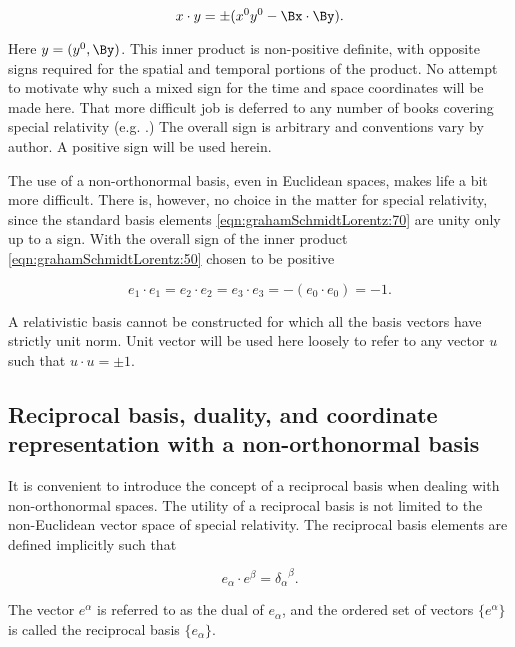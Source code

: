 \begin{equation}\label{eqn:grahamSchmidtLorentz:50}
x \cdot y = \pm( x^0 y^0 - \Bx \cdot \By ).
\end{equation}

Here $y = (y^0, \By)$.  This inner product is non-positive definite, with opposite signs required for the spatial and temporal portions of the product.
No attempt to motivate why such a mixed sign for the time and space coordinates will be made here.  That more difficult job is deferred to any number of books covering special relativity
(e.g. \citep{landau1980classical}.)
The overall sign is arbitrary and conventions vary by author.  A positive sign will be used herein.

The use of a non-orthonormal basis, even in Euclidean spaces, makes life a bit more difficult.  There is, however, no choice in the matter for special relativity, since the standard basis elements \ref{eqn:grahamSchmidtLorentz:70} are unity only up to a sign.  With the overall sign of the inner product \ref{eqn:grahamSchmidtLorentz:50} chosen to be positive

\begin{equation}\label{eqn:grahamSchmidtLorentz:860}
e_1 \cdot e_1 = e_2 \cdot e_2 = e_3 \cdot e_3 = -( e_0 \cdot e_0 ) = -1.
\end{equation}

A relativistic basis cannot be constructed for which all the basis vectors have strictly unit norm.  Unit vector will be used here loosely to refer to any vector $u$ such that $u \cdot u = \pm 1$.

\subsection{Reciprocal basis, duality, and coordinate representation with a non-orthonormal basis}

It is convenient to introduce the concept of a reciprocal basis when dealing with non-orthonormal spaces.  The utility of a reciprocal basis is not limited to the non-Euclidean vector space of special relativity.  The reciprocal basis elements are defined implicitly such that

\begin{equation}\label{eqn:grahamSchmidtLorentz:130}
e_\alpha \cdot e^\beta = {\delta_\alpha}^\beta.
\end{equation}

The vector $e^\alpha$ is referred to as the dual of $e_\alpha$, and the ordered set of vectors $\{e^\alpha\}$ is called the reciprocal basis $\{e_\alpha\}$.

